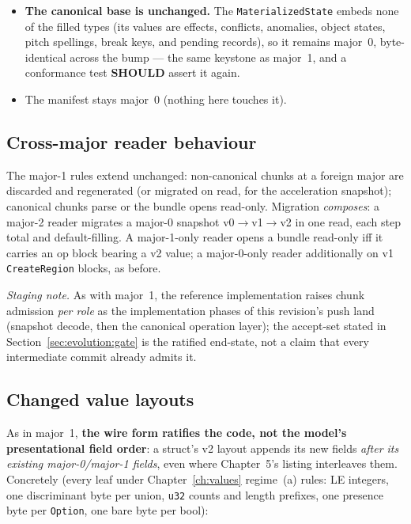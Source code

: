 \documentclass[11pt,letterpaper]{report}
\newcommand{\SHOULD}{\textbf{SHOULD}}
\begin{document}
\begin{itemize}
    layout, so the kind append is a schema \emph{minor}, and a
    \texttt{TransposeInterval} rides in a major-0 block); every
    other payload keeps its prior major. A block stamps the maximum
    over its payloads. A document reader holds every block to this
    derivation, major and minor, and refuses a block stamped otherwise
    by name (Requirement~\ref{req:binfmt:op-block-boundary}).
    (Operation names are the Operation Catalog's; core Chapter~6's
    enum spells the creates \texttt{InsertStaff} /
    \texttt{InsertStaffInstance} / \texttt{InsertRegion}.)
  \item \textbf{The canonical base is unchanged.} The
    \texttt{MaterializedState} embeds none of the filled types (its
    values are effects, conflicts, anomalies, object states, pitch
    spellings, break keys, and pending records), so it remains major~0,
    byte-identical across the bump --- the same keystone as major~1, and
    a conformance test \SHOULD{} assert it again.
  \item The manifest stays major~0 (nothing here touches it).
\end{itemize}

\subsection{Cross-major reader behaviour}
The major-1 rules extend unchanged: non-canonical chunks at a foreign
major are discarded and regenerated (or migrated on read, for the
acceleration snapshot); canonical chunks parse or the bundle opens
read-only. Migration \emph{composes}: a major-2 reader migrates a major-0
snapshot v0${\to}$v1${\to}$v2 in one read, each step total and
default-filling. A major-1-only reader opens a bundle read-only iff it
carries an op block bearing a v2 value; a major-0-only reader
additionally on v1 \texttt{CreateRegion} blocks, as before.

\emph{Staging note.} As with major~1, the reference implementation
raises chunk admission \emph{per role} as the implementation phases of
this revision's push land (snapshot decode, then the canonical
operation layer); the accept-set stated in
Section~\ref{sec:evolution:gate} is the ratified end-state, not a claim
that every intermediate commit already admits it.

\subsection{Changed value layouts}
As in major~1, \textbf{the wire form ratifies the code, not the model's
presentational field order}: a struct's v2 layout appends its new fields
\emph{after its existing major-0/major-1 fields}, even where Chapter~5's
listing interleaves them. Concretely (every leaf under
Chapter~\ref{ch:values} regime~(a) rules: LE integers, one discriminant
byte per union, \texttt{u32} counts and length prefixes, one presence
byte per \texttt{Option}, one bare byte per bool):
\end{document}
